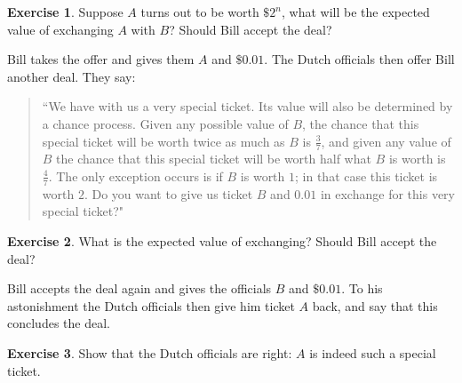 \documentclass[11pt]{article}
\theoremstyle{definition}
\newtheorem{exer}{Exercise}
\begin{document}
\begin{exer}
Suppose $A$ turns out to be worth $\$ 2^n$, what will be the expected value of exchanging $A$ with $B$? Should Bill accept the deal?
\end{exer}

Bill takes the offer and gives them $A$ and $\$ 0.01$. The Dutch officials then offer Bill another deal. They say: 

\begin{quote}
``We have with us a very special ticket. Its value will also be determined by a chance process. Given any possible value of $B$, the chance that this special ticket will be worth twice as much as $B$ is $\frac{3}{7}$, and given any value of $B$ the chance that this special ticket will be worth half what $B$ is worth is $\frac{4}{7}$. The only exception occurs is if $B$ is worth $1$; in that case this ticket is worth $2$. Do you want to give us ticket $B$ and $0.01$ in exchange for this very special ticket?"
\end{quote}



\begin{exer}
What is the expected value of exchanging? Should Bill accept the deal?
\end{exer}


Bill accepts the deal again and gives the officials $B$ and $\$ 0.01$. To his astonishment the Dutch officials then give him ticket $A$ back, and say that this concludes the deal.

\begin{exer}
Show that the Dutch officials are right: $A$ is indeed such a special ticket.
\end{exer}
\end{document}
